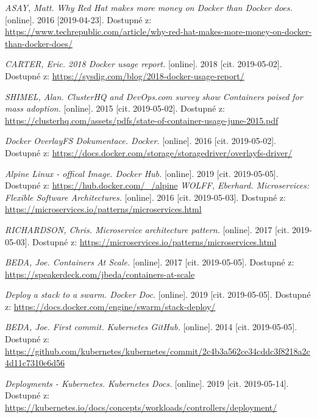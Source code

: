 \begin{thebibliography}{10}
    \emph{ASAY, Matt. Why Red Hat makes more money on Docker than Docker does.} [online]. 2016 [2019-04-23]. Dostupné z: \url{https://www.techrepublic.com/article/why-red-hat-makes-more-money-on-docker-than-docker-does/}    

    \emph{CARTER, Eric. 2018 Docker usage report.} [online]. 2018 [cit. 2019-05-02]. Dostupné z: \url{https://sysdig.com/blog/2018-docker-usage-report/}    

    \emph{SHIMEL, Alan. ClusterHQ and DevOps.com survey show Containers poised for mass adoption.} [online]. 2015 [cit. 2019-05-02]. Dostupné z: \url{https://clusterhq.com/assets/pdfs/state-of-container-usage-june-2015.pdf}

    \emph{Docker OverlayFS Dokumentace. Docker.} [online]. 2016 [cit. 2019-05-02]. Dostupné z: \url{https://docs.docker.com/storage/storagedriver/overlayfs-driver/}  
    
    \emph{Alpine Linux - offical Image. Docker Hub.} [online]. 2019 [cit. 2019-05-05]. Dostupné z: \url{https://hub.docker.com/_/alpine}    
    \emph{ WOLFF, Eberhard. Microservices: Flexible Software Architectures.} [online]. 2016 [cit. 2019-05-03]. Dostupné z: \url{https://microservices.io/patterns/microservices.html}  

    \emph{RICHARDSON, Chris. Microservice architecture pattern.} [online]. 2017 [cit. 2019-05-03]. Dostupné z: \url{https://microservices.io/patterns/microservices.html}  

    \emph{BEDA, Joe. Containers At Scale.} [online]. 2017 [cit. 2019-05-05]. Dostupné z: \url{https://speakerdeck.com/jbeda/containers-at-scale}

    \emph{Deploy a stack to a swarm. Docker Doc.} [online]. 2019 [cit. 2019-05-05]. Dostupné z: \url{https://docs.docker.com/engine/swarm/stack-deploy/}  
 
    \emph{BEDA, Joe. First commit. Kubernetes GitHub.} [online]. 2014 [cit. 2019-05-05]. Dostupné z: \url{https://github.com/kubernetes/kubernetes/commit/2c4b3a562ce34cddc3f8218a2c4d11c7310e6d56}        	

    \emph{Deployments - Kubernetes. Kubernetes Docs.} [online]. 2019 [cit. 2019-05-14]. Dostupné z: \url{https://kubernetes.io/docs/concepts/workloads/controllers/deployment/} 
 

\end{thebibliography}
